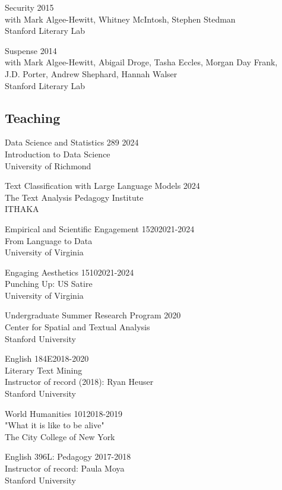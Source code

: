 \documentclass[
  12pt,
  letterpaper,
]{article}
\begin{document}
Security \hfill 2015\\
with Mark Algee-Hewitt, Whitney McIntosh, Stephen
Stedman\\
Stanford Literary Lab

Suspense \hfill 2014\\
with Mark Algee-Hewitt, Abigail Droge, Tasha Eccles,
Morgan Day Frank,\\
J.D. Porter, Andrew Shephard, Hannah Walser\\
Stanford Literary Lab

\hypertarget{teaching}{%
\subsection{Teaching}\label{teaching}}

Data Science and Statistics 289 \hfill 2024\\
Introduction to Data Science\\
University of Richmond

Text Classification with Large Language Models \hfill 2024\\
The Text Analysis Pedagogy Institute\\
ITHAKA

Empirical and Scientific Engagement 1520\hfill 2021-2024\\
From Language to Data\\
University of Virginia

Engaging Aesthetics 1510\hfill 2021-2024\\
Punching Up: US Satire\\
University of Virginia

Undergraduate Summer Research Program \hfill 2020\\
Center for Spatial and Textual Analysis\\
Stanford University

English 184E\hfill 2018-2020\\
Literary Text Mining\\
Instructor of record (2018): Ryan Heuser\\
Stanford University

World Humanities 101\hfill 2018-2019\\
"What it is like to be alive"\\
The City College of New York

English 396L: Pedagogy \hfill 2017-2018\\
Instructor of record: Paula Moya\\
Stanford University
\end{document}
